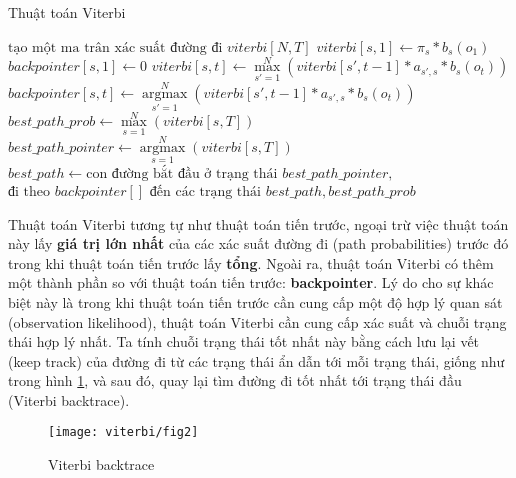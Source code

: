 \begin{breakablealgorithm}
  \caption{Thuật toán Viterbi}
  \begin{algorithmic}[1]
   \State $\text{tạo một ma trân xác suất đường đi } viterbi[N, T]$
    \State {}
        \State $viterbi[s,1] \gets \pi_s * b_s \left( {o_1} \right)$
        \State $backpointer[s, 1] \gets 0$
        \State {}
     \EndFor
        	\State $viterbi[s, t] \gets \mathop {\max }\limits_{s' = 1}^N \left( {viterbi\left[ {s',t - 1} \right]*{a_{s',s}}*{b_s}\left( {{o_t}} \right)} \right)$
        	\State $backpointer[s, t] \gets \mathop {\arg \max }\limits_{s' = 1}^N \left( {viterbi\left[ {s',t - 1} \right]*{a_{s',s}}*{b_s}\left( {{o_t}} \right)} \right)$
        \EndFor
      \EndFor
     \State {}
     \State $best\_path\_prob \gets \mathop {\max }\limits_{s = 1}^N \left( {viterbi\left[ {s,T} \right]} \right)$
     \State $best\_path\_pointer \gets \mathop {\arg \max }\limits_{s = 1}^N \left( {viterbi\left[ {s,T} \right]} \right) $
     \State $best\_path \gets \text{con đường bắt đầu ở trạng thái }  best\_path\_pointer, $
     \State $\text{đi theo } backpointer[] \text{ đến các trạng thái}$
     \State
    \Return $best\_path, best\_path\_prob$
    \EndFunction
  \end{algorithmic}
\end{breakablealgorithm}

Thuật toán Viterbi tương tự như thuật toán tiến trước, ngoại trừ việc thuật toán này lấy \textbf{giá trị lớn nhất} của các xác suất đường đi (path probabilities) trước đó trong khi thuật toán tiến trước lấy \textbf{tổng}. Ngoài ra, thuật toán Viterbi có thêm một thành phần so với thuật toán tiến trước: \textbf{backpointer}. Lý do cho sự khác biệt này là trong khi thuật toán tiến trước cần cung cấp một độ hợp lý quan sát (observation likelihood), thuật toán Viterbi cần cung cấp xác suất và chuỗi trạng thái hợp lý nhất. Ta tính chuỗi trạng thái tốt nhất này bằng cách lưu lại vết (keep track) của đường đi từ các trạng thái ẩn dẫn tới mỗi trạng thái, giống như trong hình \ref{viterbi_fig2}, và sau đó, quay lại tìm đường đi tốt nhất tới trạng thái đầu (Viterbi backtrace).

\begin{figure}[H]
\begin{center}
\texttt{[image: viterbi/fig2]}
\end{center}
\caption{Viterbi backtrace \label{viterbi_fig2}}
\end{figure}


